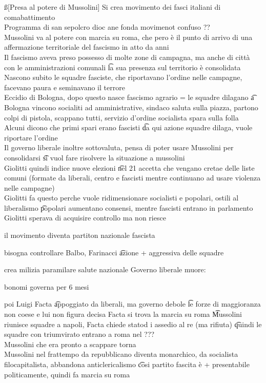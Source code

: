 \documentclass[12pt]{article}
\begin{document}
\ss[Presa al potere di Mussolini]
Si crea movimento dei fasci italiani di comabattimento \\
Programma di san sepolcro dioc ane fonda movimenot confuso ?? \\
Mussolini va al potere con marcia su roma, che pero è il punto di arrivo di una affermazione territoriale del fascismo in atto da anni \\
Il fascismo aveva preso possesso di molte zone di campagna, ma anche di città con le amministrazioni comunali \t la sua presenza sul territorio è consolidata \\
Nascono subito le squadre fasciste, che riportavano l'ordine nelle campagne, facevano paura e seminavano il terrore \\
Eccidio di Bologna, dopo questo nasce fascismo agrario = le squadre dilagano \t a Bologna vincono socialiti ad amministrative, sindaco saluta sulla piazza, partono colpi di pistola, scappano tutti, servizio d'ordine socialista spara sulla folla \\
Alcuni dicono che primi spari erano fascisti \t da qui azione squadre dilaga, vuole riportare l'ordine \\
Il governo liberale inoltre sottovaluta, pensa di poter usare Mussolini per consolidarsi \t si vuol fare risolvere la situazione a mussolini \\
Giolitti quindi indice nuove elezioni \t nel 21 accetta che vengano cretae delle liste comuni (formate da liberali, centro e fascisti mentre continuano ad usare violenza nelle campagne) \\
Giolitti fa questo perche vuole ridimensionare socialisti e popolari, ostili al liberalismo \t popolari aumentano consensi, mentre fascisti entrano in parlamento \\
Giolitti sperava di acquisire controllo ma non riesce \\
\bi
\item il movimento diventa partiton nazionale fascista
\item bisogna controllare Balbo, Farinacci \t azione + aggressiva delle squadre
\item crea milizia paramilare salute nazionale
\ei
Governo liberale muore:
\bi
\item bonomi governa per 6 mesi 
\item poi Luigi Facta \t appoggiato da liberali, ma governo debole \t le forze di maggioranza non coese e lui non figura decisa
\ei
Facta si trova la marcia su roma \t Mussolini riunisce squadre a napoli, Facta chiede statod i assedio al re (ma rifiuta) \t quindi le squadre con triumvirato entrano a roma nel ??? \\
Mussolini che era pronto a scappare torna \\
Mussolini nel frattempo da repubblicano diventa monarchico, da socialista filocapitalista, abbandona anticlericalismo \t cosi partito fascita è + presentabile politicamente, quindi fa marcia su roma
\end{document}
